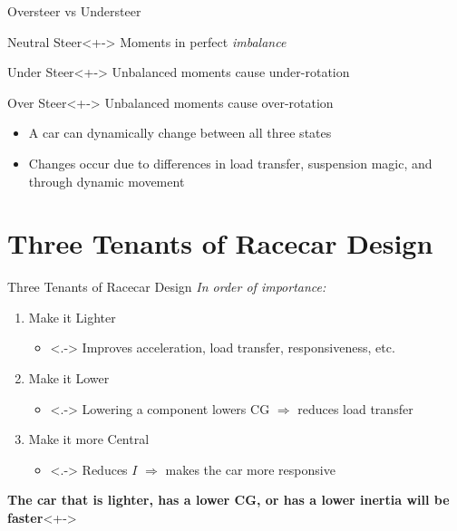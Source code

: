 \documentclass[aspectratio=169]{beamer}
\begin{document}
\begin{frame}{Oversteer vs Understeer}
    \begin{block}{Neutral Steer}<+->
        Moments in perfect \textit{imbalance}
    \end{block}
    \begin{block}{Under Steer}<+->
        Unbalanced moments cause under-rotation
    \end{block}
    \begin{block}{Over Steer}<+->
        Unbalanced moments cause over-rotation
    \end{block}

    \begin{itemize}
        \item<+-> A car can dynamically change between all three states
        \item<+-> Changes occur due to differences in load transfer, suspension magic, and through dynamic movement
    \end{itemize}
\end{frame}

\section{Three Tenants of Racecar Design}
\begin{frame}{Three Tenants of Racecar Design}
    \textit{In order of importance:}
    \begin{enumerate}
        \item<+-> Make it Lighter
            \begin{itemize}
                \item<.-> Improves acceleration, load transfer, responsiveness, etc.
            \end{itemize}
        \item<+-> Make it Lower
            \begin{itemize}
                \item<.-> Lowering a component lowers CG \(\Rightarrow\) reduces load transfer
            \end{itemize}
        \item<+-> Make it more Central
            \begin{itemize}
                \item<.-> Reduces \(I\) \(\Rightarrow\) makes the car more responsive
            \end{itemize}
    \end{enumerate}
    \begin{alertblock}{\textbf{The car that is lighter, has a lower CG, or has a lower inertia will be faster}}<+->
    \end{alertblock}

\end{frame}
\end{document}
